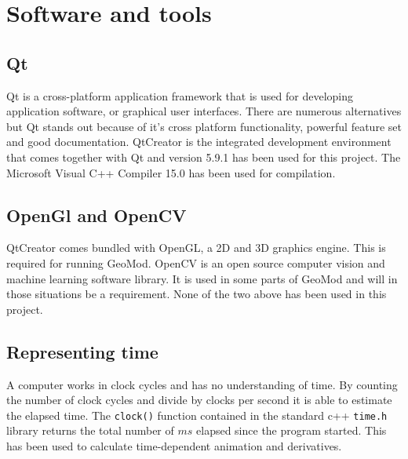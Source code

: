 \chapter{Software and tools}
\vspace*{-10mm}
\section{Qt}

Qt is a cross-platform application framework that is used for developing application software, or graphical user interfaces. There are numerous alternatives but Qt stands out because of it's cross platform functionality, powerful feature set and good documentation. QtCreator is the integrated development environment that comes together with Qt and version 5.9.1 has been used for this project. The Microsoft Visual C++ Compiler 15.0 has been used for compilation.

\section{OpenGl and OpenCV}

QtCreator comes bundled with OpenGL, a 2D and 3D graphics engine. This is required for running GeoMod. OpenCV is an open source computer vision and machine learning software library. It is used in some parts of GeoMod and will in those situations be a requirement. None of the two above has been used in this project.

\section{Representing time}\label{reptime}

A computer works in clock cycles and has no understanding of time. By counting the number of clock cycles and divide by clocks per second it is able to estimate the elapsed time. The \texttt{clock()} function contained in the standard c++ \texttt{time.h} library returns the total number of $ms$ elapsed since the program started. This has been used to calculate time-dependent animation and derivatives.
\restoregeometry
